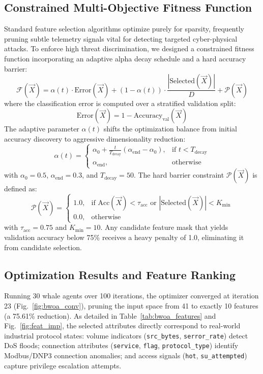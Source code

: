 \documentclass[conference]{IEEEtran}
\begin{document}
\subsection{Constrained Multi-Objective Fitness Function}
Standard feature selection algorithms optimize purely for sparsity, frequently pruning subtle telemetry signals vital for detecting targeted cyber-physical attacks. To enforce high threat discrimination, we designed a constrained fitness function incorporating an adaptive alpha decay schedule and a hard accuracy barrier:
\begin{equation}
\mathcal{F}(\vec{X}) = \alpha(t) \cdot \text{Error}(\vec{X}) + (1 - \alpha(t)) \cdot \frac{|\text{Selected}(\vec{X})|}{D} + \mathcal{P}(\vec{X})
\end{equation}
where the classification error is computed over a stratified validation split:
\begin{equation}
\text{Error}(\vec{X}) = 1 - \text{Accuracy}_{\text{val}}(\vec{X})
\end{equation}
The adaptive parameter $\alpha(t)$ shifts the optimization balance from initial accuracy discovery to aggressive dimensionality reduction:
\begin{equation}
\alpha(t) = \begin{cases} 
\alpha_0 + \frac{t}{T_{\text{decay}}}(\alpha_{\text{end}} - \alpha_0), & \text{if } t < T_{\text{decay}} \\ 
\alpha_{\text{end}}, & \text{otherwise} 
\end{cases}
\end{equation}
with $\alpha_0 = 0.5$, $\alpha_{\text{end}} = 0.3$, and $T_{\text{decay}} = 50$. The hard barrier constraint $\mathcal{P}(\vec{X})$ is defined as:
\begin{equation}
\mathcal{P}(\vec{X}) = \begin{cases} 
1.0, & \text{if } \text{Acc}(\vec{X}) < \tau_{\text{acc}} \text{ or } |\text{Selected}(\vec{X})| < K_{\text{min}} \\ 
0.0, & \text{otherwise} 
\end{cases}
\end{equation}
with $\tau_{\text{acc}} = 0.75$ and $K_{\text{min}} = 10$. Any candidate feature mask that yields validation accuracy below 75\% receives a heavy penalty of 1.0, eliminating it from candidate selection.

\subsection{Optimization Results and Feature Ranking}
Running 30 whale agents over 100 iterations, the optimizer converged at iteration 23 (Fig.~\ref{fig:bwoa_conv}), pruning the input space from 41 to exactly 10 features (a 75.61\% reduction). As detailed in Table~\ref{tab:bwoa_features} and Fig.~\ref{fig:feat_imp}, the selected attributes directly correspond to real-world industrial protocol states: volume indicators (\texttt{src\_bytes}, \texttt{serror\_rate}) detect DoS floods; connection attributes (\texttt{service}, \texttt{flag}, \texttt{protocol\_type}) identify Modbus/DNP3 connection anomalies; and access signals (\texttt{hot}, \texttt{su\_attempted}) capture privilege escalation attempts.
\end{document}
